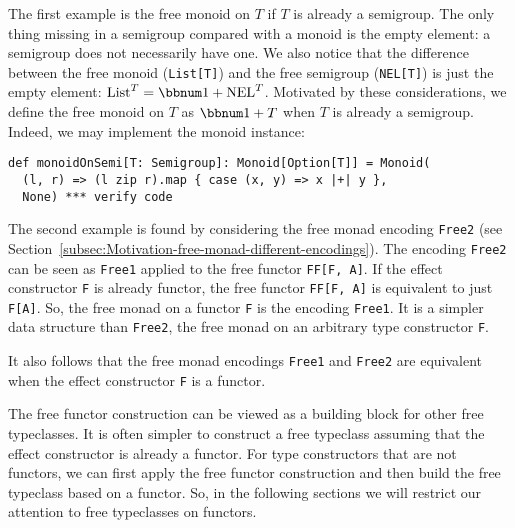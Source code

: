 The first example is the free monoid on $T$ if $T$ is already a
semigroup. The only thing missing in a semigroup compared with a monoid
is the empty element: a semigroup does not necessarily have one. We
also notice that the difference between the free monoid (\lstinline!List[T]!)
and the free semigroup (\lstinline!NEL[T]!)
is just the empty element: $\text{List}^{T}=\bbnum 1+\text{NEL}^{T}$.
Motivated by these considerations, we define the free monoid on $T$
as $\bbnum 1+T$ when $T$ is already a semigroup. Indeed, we may
implement the monoid instance:
\begin{lstlisting}
def monoidOnSemi[T: Semigroup]: Monoid[Option[T]] = Monoid(
  (l, r) => (l zip r).map { case (x, y) => x |+| y },
  None) *** verify code
\end{lstlisting}
The second example is found by considering the free monad encoding
\lstinline!Free2! (see
Section~\ref{subsec:Motivation-free-monad-different-encodings}).
The encoding \lstinline!Free2!
can be seen as \lstinline!Free1!
applied to the free functor \lstinline!FF[F, A]!.
If the effect constructor \lstinline!F!
is already functor, the free functor \lstinline!FF[F, A]!
is equivalent to just \lstinline!F[A]!.
So, the free monad on a functor \lstinline!F!
is the encoding \lstinline!Free1!.
It is a simpler data structure than \lstinline!Free2!,
the free monad on an arbitrary type constructor \lstinline!F!.

It also follows that the free monad encodings \lstinline!Free1!
and \lstinline!Free2! are
equivalent when the effect constructor \lstinline!F!
is a functor.

The free functor construction can be viewed as a building block for
other free typeclasses. It is often simpler to construct a free typeclass
assuming that the effect constructor is already a functor. For type
constructors that are not functors, we can first apply the free functor
construction and then build the free typeclass based on a functor.
So, in the following sections we will restrict our attention to free
typeclasses on functors.

